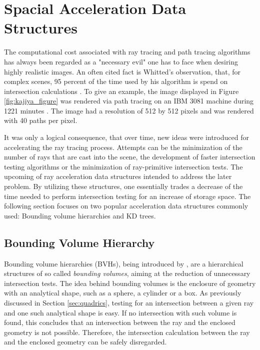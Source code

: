 \section{Spacial Acceleration Data Structures} \label{sec:acceleration}
The computational cost associated with ray tracing and path tracing algorithms has always been regarded as a "necessary evil" one has to face when desiring highly realistic images. An often cited fact is Whitted's observation, that, for complex scenes, 95 percent of the time used by his algorithm is spend on intersection calculations \cite[p 349]{whitted1979improved}. To give an example, the image displayed in Figure \ref{fig:kajiya_figure} was rendered via path tracing on an IBM 3081 machine during 1221 minutes \cite[p 149]{kajiya1986rendering}. The image had a resolution of 512 by 512 pixels and was rendered with 40 paths per pixel.

It was only a logical consequence, that over time, new ideas were introduced for accelerating the ray tracing process. Attempts can be the minimization of the number of rays that are cast into the scene, the development of faster intersection testing algorithms or the minimization of ray-primitive intersection tests. The upcoming of ray acceleration data structures intended to address the later problem. By utilizing these structures, one essentially trades a decrease of the time needed to perform intersection testing for an increase of storage space. The following section focuses on two popular acceleration data structures commonly used: Bounding volume hierarchies and KD trees.

\subsection{Bounding Volume Hierarchy}

Bounding volume hierarchies (BVHs), being introduced by \cite{rubin19803}, are a hierarchical structures of so called \emph{bounding volumes}, aiming at the reduction of unnecessary intersection tests. The idea behind bounding volumes is the enclosure of geometry with an analytical shape, such as a sphere, a cylinder or a box. As previously discussed in Section \ref{sec:quadrics}, testing for an intersection between a given ray and one such analytical shape is easy. If no intersection with such volume is found, this concludes that an intersection between the ray and the enclosed geometry is not possible. Therefore, the intersection calculation between the ray and the enclosed geometry can be safely disregarded. 

